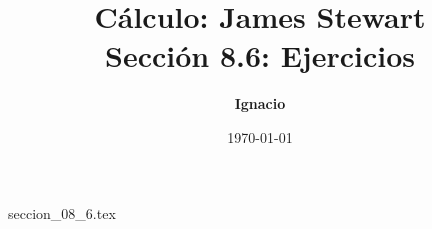 \documentclass[11pt,spanish,oneside]{report}
\title{\textbf{Cálculo: James Stewart} \\ \Large Sección 8.6: Ejercicios}
\author{\textbf{Ignacio}}
\date{\today}
\begin{document}
\maketitle

{seccion_08_6.tex}
\end{document}
